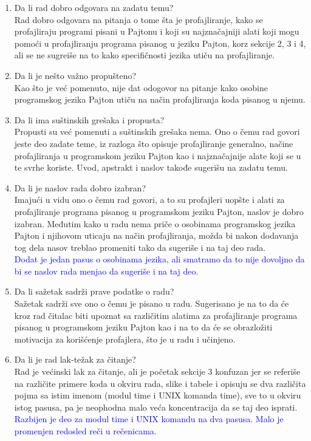\documentclass[a4paper]{report}
\newcommand{\odgovor}[1]{\textcolor{blue}{#1}}
\begin{document}
\begin{enumerate}
\item Da li rad dobro odgovara na zadatu temu?\\
Rad dobro odgovara na pitanja o tome šta je profajliranje, kako se profajliraju programi pisani u Pajtonu i koji su najznačajniji alati koji mogu pomoći u profajliranju programa pisanog u jeziku Pajton, korz sekcije 2, 3 i 4, ali se ne sugreiše na to kako specifičnosti jezika utiču na profajliranje.

\item Da li je nešto važno propušteno?\\
Kao što je već pomenuto, nije dat odogovor na pitanje kako osobine programskog jezika Pajton utiču na način profajliranja koda pisanog u njemu.

\item Da li ima suštinskih grešaka i propusta?\\
Propusti su već pomenuti a suštinskih grešaka nema. Ono o čemu rad govori jeste deo zadate teme, iz razloga što opisuje profajliranje generalno, načine profajliranja u programskom jeziku Pajton kao i najznačajnije alate koji se u te svrhe koriste. Uvod, apstrakt i naslov takođe sugerišu na zadatu temu.


\item Da li je naslov rada dobro izabran?\\
Imajući u vidu ono o čemu rad govori, a to su profajleri uopšte i alati za profajliranje programa pisanog u programskom jeziku Pajton, naslov je dobro izabran. Međutim kako u radu nema priče o osobinama programskog jezika Pajton i njihovom uticaju na način profajliranja, možda bi nakon dodavanja tog dela nasov treblao promeniti tako da sugeriše i na taj deo rada.\\
\odgovor{Dodat je jedan pasus o osobinama jezika, ali smatramo da to nije dovoljno da bi se naslov rada menjao da sugeriše i na taj deo.}


\item Da li sažetak sadrži prave podatke o radu?\\
Sažetak sadrži sve ono o čemu je pisano u radu. Sugerisano je na to da će kroz rad čitalac biti upoznat sa različitim alatima za profajliranje programa pisanog u programskom jeziku Pajton kao i na to da će se obrazložiti motivacija za korišćenje profajlera, što je u radu i učinjeno.

\item Da li je rad lak-težak za čitanje?\\
Rad je većinski lak za čitanje, ali je početak sekcije 3 konfuzan jer se referiše na različite primere koda u okviru rada, slike i tabele i opisuju se dva različita pojma sa istim imenom (modul time i UNIX komanda time), sve to u okviru istog pasusa, pa je neophodna malo veća koncentracija da se taj deo isprati.\\
\odgovor{Razbijen je deo za modul time i UNIX komandu na dva pasusa. Malo je promenjen redosled reči u rečenicama.}



\end{enumerate}
\end{document}
